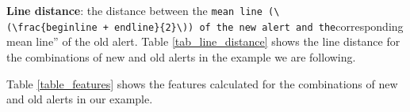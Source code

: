 \documentclass[
]{article}
\begin{document}
\noindent \textbf{Line distance}: the distance between the
\texttt{mean\ line\textquotesingle{}\textquotesingle{}\ (\textbackslash{}(\textbackslash{}frac\{beginline\ +\ endline\}\{2\}\textbackslash{}))\ of\ the\ new\ alert\ and\ the}corresponding
mean line'' of the old alert. Table \ref{tab_line_distance} shows the
line distance for the combinations of new and old alerts in the example
we are following.

\small

\begin{table}[H]

\caption{\label{tab:unnamed-chunk-12}Line distance feature \label{tab_line_distance}}
\centering
{}
\end{table}

\normalsize

Table \ref{table_features} shows the features calculated for the
combinations of new and old alerts in our example.

\small
\end{document}
